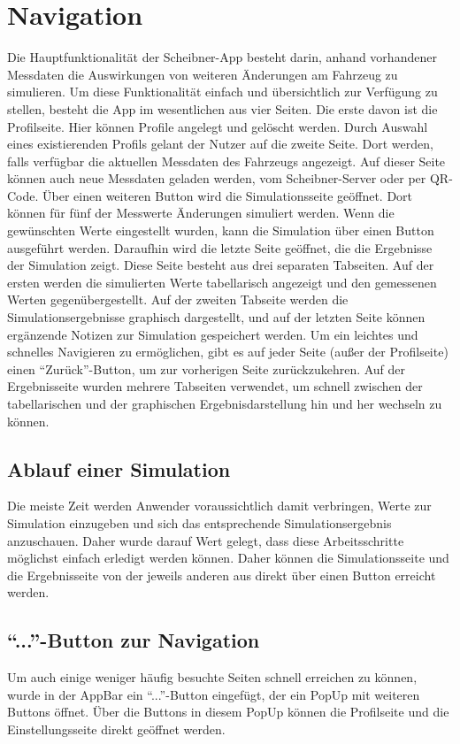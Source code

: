 \chapter{Navigation}
\label{chap:nav}

Die Hauptfunktionalität der Scheibner-App besteht darin, anhand vorhandener Messdaten die Auswirkungen von weiteren Änderungen am Fahrzeug zu simulieren. Um diese Funktionalität einfach und übersichtlich zur Verfügung zu stellen, besteht die App im wesentlichen aus vier Seiten. Die erste davon ist die Profilseite. Hier können Profile angelegt und gelöscht werden. Durch Auswahl eines existierenden Profils gelant der Nutzer auf die zweite Seite. Dort werden, falls verfügbar die aktuellen Messdaten des Fahrzeugs angezeigt. Auf dieser Seite können auch neue Messdaten geladen werden, vom Scheibner-Server oder per QR-Code.
Über einen weiteren Button wird die Simulationsseite geöffnet. Dort können für fünf der Messwerte Änderungen simuliert werden. Wenn die gewünschten Werte eingestellt wurden, kann die Simulation über einen Button ausgeführt werden. Daraufhin wird die letzte Seite geöffnet, die die Ergebnisse der Simulation zeigt. Diese Seite besteht aus drei separaten Tabseiten. Auf der ersten werden die simulierten Werte tabellarisch angezeigt und den gemessenen Werten gegenübergestellt. Auf der zweiten Tabseite werden die Simulationsergebnisse graphisch dargestellt, und auf der letzten Seite können ergänzende Notizen zur Simulation gespeichert werden.
Um ein leichtes und schnelles Navigieren zu ermöglichen, gibt es auf jeder Seite (außer der Profilseite) einen ``Zurück''-Button, um zur vorherigen Seite zurückzukehren. Auf der Ergebnisseite wurden mehrere Tabseiten verwendet, um schnell zwischen der tabellarischen und der graphischen Ergebnisdarstellung hin und her wechseln zu können.

	\section{Ablauf einer Simulation}
	\label{sec:sim-ablauf}
    Die meiste Zeit werden Anwender voraussichtlich damit verbringen, Werte zur Simulation einzugeben und sich das entsprechende Simulationsergebnis anzuschauen. Daher wurde darauf Wert gelegt, dass diese Arbeitsschritte möglichst einfach erledigt werden können.
    Daher können die Simulationsseite und die Ergebnisseite von der jeweils anderen aus direkt über einen Button erreicht werden.
	
	\section{``...''-Button zur Navigation}
	\label{sec:change-prof}
    Um auch einige weniger häufig besuchte Seiten schnell erreichen zu können, wurde in der AppBar ein ``...''-Button eingefügt, der ein PopUp mit weiteren Buttons öffnet. Über die Buttons in diesem PopUp können die Profilseite und die Einstellungsseite direkt geöffnet werden.
    
